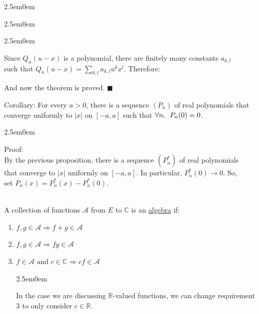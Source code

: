 \documentclass{book}
\newcommand{\hThree}{%
   \color{PineGreen!85!Orange}
   \fontsize{13}{15}\selectfont%
}
\newcommand{\teachComment}{
   \color{Orange}%
   \fontsize{12}{14}\selectfont%
}
\newenvironment{myIndent}{%
   \begin{adjustwidth}{2.5em}{0em}%
}{%
   \end{adjustwidth}%
}
\newcommand{\udefine}[1]{{%
   \setulcolor{Red}%
   \setul{0.14em}{0.07em}%
   \ul{#1}%
}}
\newcommand{\myHS}{ \hspace{0.5em}}
\newcommand{\mySepTwo}[1][.]{%
   {\noindent\color{#1}{\rule{6.5in}{0.5mm}}}\\%
}
\newcommand{\retTwo}{\hfill\bigbreak}
\begin{document}
{\begin{myIndent}
{\begin{myIndent}
{\begin{myIndent}
         \newpage

         Since $Q_n(u-x)$ is a polynomial, there are finitely many constants $a_{k,l}$\\ such that $Q_n(u-x) = \sum\limits_{k,l} a_{k,l}u^k x^l$. Therefore:\\ [-6pt]

         { \retTwo\par}
      \end{myIndent}}

      And now the theorem is proved. $\blacksquare$\retTwo
   \end{myIndent}}

   Corollary: For every $a > 0$, there is a sequence $(P_n)$ of real polynomials that\\ converge uniformly to $|x|$ on $[-a, a]$ such that $\forall n,\myHS P_n(0) = 0$.

   
   {\begin{myIndent}\hThree
      Proof:\\
      By the previous proposition, there is a sequence $(P_n^*)$ of real polynomials\\ that converge to $|x|$ uniformly on $[-a, a]$. In particular, $P_n^*(0) \rightarrow 0$. So,\\ set $P_n(x) = P_n^*(x) - P_n^*(0)$.\retTwo
   \end{myIndent}}
\end{myIndent}}

\mySepTwo

A collection of functions $\mathscr{A}$ from $E$ to $\mathbb{C}$ is an \udefine{algebra} if:
\begin{enumerate}
   \item $f, g \in \mathscr{A} \Longrightarrow f + g \in \mathscr{A}$
   \item $f,g \in \mathscr{A} \Longrightarrow fg \in \mathscr{A}$
   \item $f \in \mathscr{A} \text{ and } c \in \mathbb{C} \Longrightarrow cf \in \mathscr{A}$
   {\begin{myIndent}\teachComment
      In the case we are discussing $\mathbb{R}$-valued functions, we can change requirement\\ 3 to only consider $c \in \mathbb{R}$.\retTwo
   \end{myIndent}}
\end{enumerate}
\end{document}
